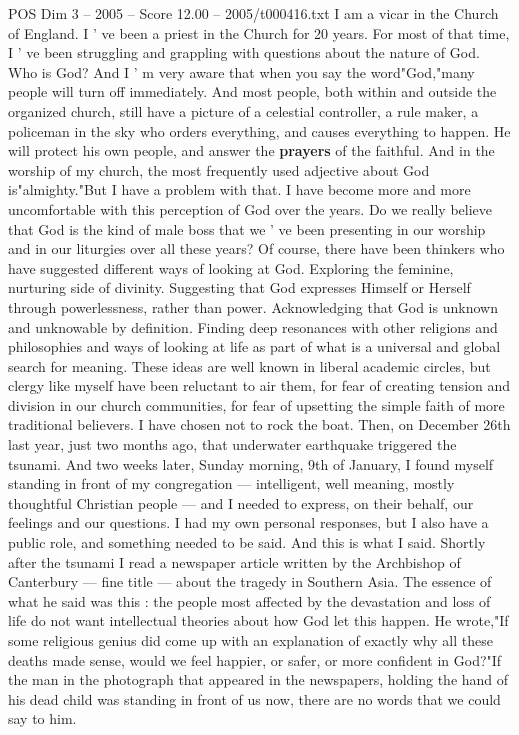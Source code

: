 \begin{textsample}{POS Dim 3 – 2005 – Score 12.00 – 2005/t000416.txt}  \label{ex:f3_pos_047}
I am a vicar in the Church of England.
I ' ve been a priest in the Church for 20 years.
For most of that time, I ' ve been struggling and grappling with questions about the nature of God.
Who is God?
And I ' m very aware that when you say the word"God,"many people will turn off immediately.
And most people, both within and outside the organized church, still have a picture of a celestial controller, a rule maker, a policeman in the sky who orders everything, and causes everything to happen.
He will protect his own people, and answer the \textbf{prayers} of the faithful.
And in the worship of my church, the most frequently used adjective about God is"almighty."But I have a problem with that.
I have become more and more uncomfortable with this perception of God over the years.
Do we really believe that God is the kind of male boss that we ' ve been presenting in our worship and in our liturgies over all these years?
Of course, there have been thinkers who have suggested different ways of looking at God.
Exploring the feminine, nurturing side of divinity.
Suggesting that God expresses Himself or Herself through powerlessness, rather than power.
Acknowledging that God is unknown and unknowable by definition.
Finding deep resonances with other religions and philosophies and ways of looking at life as part of what is a universal and global search for meaning.
These ideas are well known in liberal academic circles, but clergy like myself have been reluctant to air them, for fear of creating tension and division in our church communities, for fear of upsetting the simple faith of more traditional believers.
I have chosen not to rock the boat.
Then, on December 26th last year, just two months ago, that underwater earthquake triggered the tsunami.
And two weeks later, Sunday morning, 9th of January, I found myself standing in front of my congregation — intelligent, well meaning, mostly thoughtful Christian people — and I needed to express, on their behalf, our feelings and our questions.
I had my own personal responses, but I also have a public role, and something needed to be said.
And this is what I said.
Shortly after the tsunami I read a newspaper article written by the Archbishop of Canterbury — fine title — about the tragedy in Southern Asia.
The essence of what he said was this : the people most affected by the devastation and loss of life do not want intellectual theories about how God let this happen.
He wrote,"If some religious genius did come up with an explanation of exactly why all these deaths made sense, would we feel happier, or safer, or more confident in God?"If the man in the photograph that appeared in the newspapers, holding the hand of his dead child was standing in front of us now, there are no words that we could say to him.

\end{textsample}
